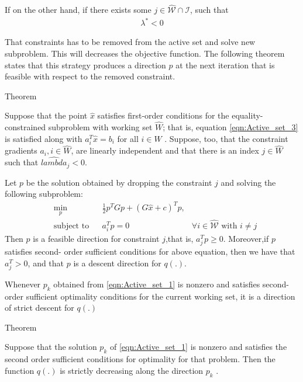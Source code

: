 If on the other hand, if there exists some $j \in \hat{\mathcal{W}}\cap \mathcal{I}$, such that
\begin{equation*}
	\begin{aligned}
		\lambda^* < 0
	\end{aligned}
\end{equation*}

That constraints has to be removed from the active set and solve new subproblem. This will decreases the objective function. The following theorem states that this strategy produces a direction $p$ at the next iteration  that is feasible with respect to the removed constraint.
\begin{mybox}{Theorem}
\begin{theorem}
	Suppose that the point $\hat{x}$ satisfies first-order conditions for the equality-constrained subproblem with working set $\hat{W}$; that is, equation \ref{eqn:Active_set_3} is satisfied along with $a_i^T\hat{x}=b_i$ for all $i\in \hat{W}$ . Suppose, too, that the constraint gradients $a_i,i\in \hat{W}$, are linearly independent and that there is an index $j\in \hat{W}$ such that $\hat{lambda}_j<0$. 
	
	Let $p$ be the solution obtained by dropping the constraint $j$ and solving the following subproblem:
	\begin{equation}
	\begin{aligned}
		& \underset{p}{\text{min}} & & \frac{1}{2}p^{T}Gp+(G\hat{x}+c)^{T}p, \\
& \text{subject to} & &  a_{i}^{T}p = 0 & \forall i\in \hat{\mathcal{W}} \text{ with } i\neq j
	\end{aligned}
	\label{eqn:Active_set_5}
\end{equation}
Then $p$ is a feasible direction for constraint $j$,that is, $a_j^Tp \geqslant 0$. Moreover,if $p$ satisfies second- order sufficient conditions for above equation, then we have that $a_j^T > 0$, and that $p$ is a descent direction for $q(.)$.
\end{theorem}
\end{mybox}
Whenever $p_k$ obtained from \ref{eqn:Active_set_1} is nonzero and satisfies second-order sufficient optimality conditions for the current working set, it is a direction of strict descent for $q(.)$


\begin{mybox}{Theorem}
\begin{theorem}
	Suppose that the solution $p_k$ of \ref{eqn:Active_set_1} is nonzero and satisfies the second order sufficient conditions for optimality for that problem. Then the function $q(.)$ is strictly decreasing along the direction $p_k$ .
\end{theorem}
\end{mybox}

